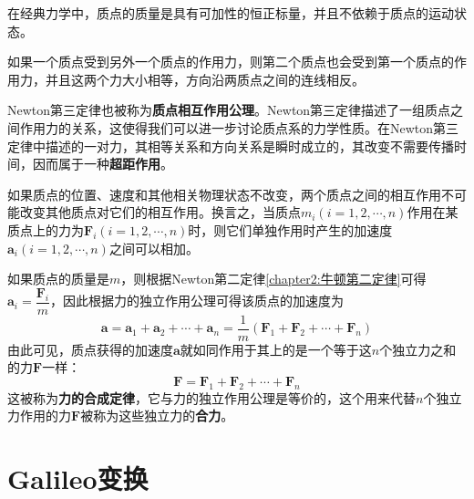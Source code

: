在经典力学中，质点的质量是具有可加性的恒正标量，并且不依赖于质点的运动状态。


\begin{law}[Newton第三定律]
	如果一个质点受到另外一个质点的作用力，则第二个质点也会受到第一个质点的作用力，并且这两个力大小相等，方向沿两质点之间的连线相反。
\end{law}

Newton第三定律也被称为{\bf 质点相互作用公理}。Newton第三定律描述了一组质点之间作用力的关系，这使得我们可以进一步讨论质点系的力学性质。在Newton第三定律中描述的一对力，其相等关系和方向关系是瞬时成立的，其改变不需要传播时间，因而属于一种{\bf 超距作用}。


\begin{law}[力的独立作用定律]
	如果质点的位置、速度和其他相关物理状态不改变，两个质点之间的相互作用不可能改变其他质点对它们的相互作用。换言之，当质点$m_i(i=1,2,\cdots,n)$作用在某质点上的力为$\boldsymbol{F}_i(i=1,2,\cdots,n)$时，则它们单独作用时产生的加速度$\boldsymbol{a}_i(i=1,2,\cdots,n)$之间可以相加。
\end{law}

如果质点的质量是$m$，则根据Newton第二定律\eqref{chapter2:牛顿第二定律}可得$\boldsymbol{a}_i = \dfrac{\boldsymbol{F}_i}{m}$，因此根据力的独立作用公理可得该质点的加速度为
\begin{equation}
	\boldsymbol{a} = \boldsymbol{a}_1 + \boldsymbol{a}_2 + \cdots + \boldsymbol{a}_n = \frac{1}{m}\left(\boldsymbol{F}_1 + \boldsymbol{F}_2 + \cdots + \boldsymbol{F}_n\right)
\end{equation}
由此可见，质点获得的加速度$\boldsymbol{a}$就如同作用于其上的是一个等于这$n$个独立力之和的力$\boldsymbol{F}$一样：
\begin{equation}
	\boldsymbol{F} = \boldsymbol{F}_1 + \boldsymbol{F}_2 + \cdots + \boldsymbol{F}_n
\end{equation}
这被称为{\bf 力的合成定律}，它与力的独立作用公理是等价的，这个用来代替$n$个独立力作用的力$\boldsymbol{F}$被称为这些独立力的{\bf 合力}。

\section{Galileo变换}

